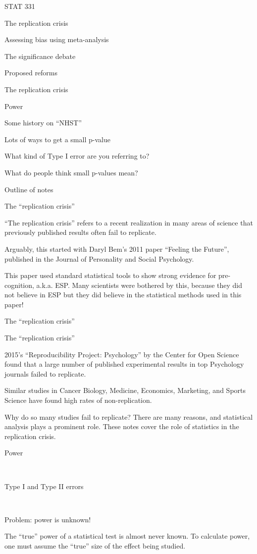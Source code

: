 \documentclass[
  letterpaper,
  DIV=11,
  numbers=noendperiod]{scrreprt}
\begin{document}
STAT 331

The replication crisis

Assessing bias using meta-analysis

The significance debate

Proposed reforms

The replication crisis

Power

Some history on ``NHST''

Lots of ways to get a small p-value

What kind of Type I error are you referring to?

What do people think small p-values mean?

Outline of notes

The ``replication crisis''

``The replication crisis'' refers to a recent realization in many areas
of science that previously published results often fail to replicate.

Arguably, this started with Daryl Bem's 2011 paper ``Feeling the
Future'', published in the Journal of Personality and Social Psychology.

This paper used standard statistical tools to show strong evidence for
pre-cognition, a.k.a. ESP. Many scientists were bothered by this,
because they did not believe in ESP but they did believe in the
statistical methods used in this paper!

The ``replication crisis''

The ``replication crisis''

2015's ``Reproducibility Project: Psychology'' by the Center for Open
Science found that a large number of published experimental results in
top Psychology journals failed to replicate.

Similar studies in Cancer Biology, Medicine, Economics, Marketing, and
Sports Science have found high rates of non-replication.

Why do so many studies fail to replicate? There are many reasons, and
statistical analysis plays a prominent role. These notes cover the role
of statistics in the replication crisis.

Power

~

Type I and Type II errors

~

Problem: power is unknown!

The ``true'' power of a statistical test is almost never known. To
calculate power, one must assume the ``true'' size of the effect being
studied.
\end{document}
